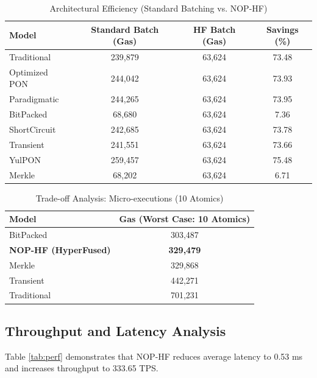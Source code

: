 \documentclass[conference]{IEEEtran}
\begin{document}
\begin{table}[htbp]
\caption{Architectural Efficiency (Standard Batching vs. NOP-HF)}
\begin{center}
\begin{tabular}{|l|c|c|c|}
\hline
\textbf{Model} & \textbf{Standard Batch (Gas)} & \textbf{HF Batch (Gas)} & \textbf{Savings (\%)} \\
\hline
Traditional   & 239,879 & 63,624 & 73.48 \\
Optimized PON & 244,042 & 63,624 & 73.93 \\
Paradigmatic  & 244,265 & 63,624 & 73.95 \\
BitPacked     & 68,680  & 63,624 & 7.36  \\
ShortCircuit  & 242,685 & 63,624 & 73.78 \\
Transient     & 241,551 & 63,624 & 73.66 \\
YulPON        & 259,457 & 63,624 & 75.48 \\
Merkle        & 68,202  & 63,624 & 6.71  \\
\hline
\end{tabular}
\label{tab:arch}
\end{center}
\end{table}


\begin{table}[htbp]
\caption{Trade-off Analysis: Micro-executions (10 Atomics)}
\begin{center}
\begin{tabular}{|l|c|}
\hline
\textbf{Model} & \textbf{Gas (Worst Case: 10 Atomics)} \\
\hline
BitPacked        & 303,487 \\
\textbf{NOP-HF (HyperFused)} & \textbf{329,479} \\
Merkle           & 329,868 \\
Transient        & 442,271 \\
Traditional      & 701,231 \\
\hline
\end{tabular}
\label{tab:tradeoff}
\end{center}
\end{table}


\subsection{Throughput and Latency Analysis}

Table \ref{tab:perf} demonstrates that NOP-HF reduces average latency to 0.53 ms and increases throughput to 333.65 TPS.
\end{document}
